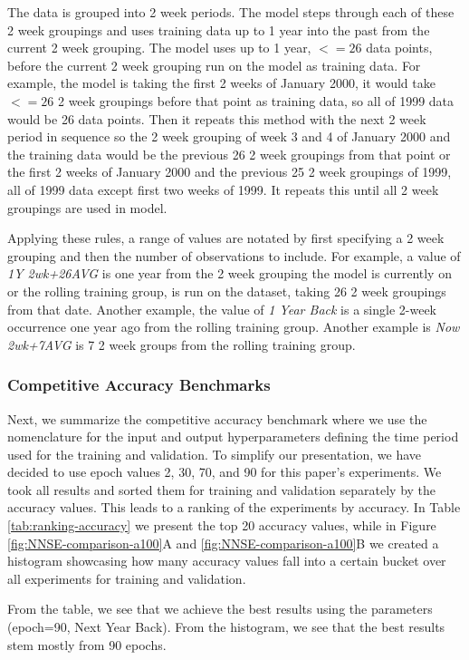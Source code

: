 \documentclass[utf8]{FrontiersinVancouver} %
\begin{document}
The data is grouped into 2 week periods. The model steps through
each of these 2 week groupings and uses training data up to 1 year
into the past from the current 2 week grouping. The model uses up 
to 1 year, $<=26$ data points, before the current 2 week grouping 
run on the model as training data. For example, the model is taking 
the first 2 weeks of January 2000, it would take $<=26$ 2 week groupings 
before that point as training data, so all of 1999 data would be 26 
data points. Then it repeats this method with the next 2 week period 
in sequence so the 2 week grouping of week 3 and 4 of January 2000 
and the training data would be the previous 26 2 week groupings from 
that point or the first 2 weeks of January 2000 and the previous 25 
2 week groupings of 1999, all of 1999 data except first two weeks of 
1999. It repeats this until all 2 week groupings are used in model.

Applying these rules, a range of values are notated by first specifying a 2 week grouping
and then the number of observations to include.  For example, a value of {\em 1Y 2wk+26AVG} 
is one year from the 2 week grouping the model is currently on or the rolling training group,
is run on the dataset, taking 26 2 week groupings from that date. Another example, the value 
of {\em 1 Year Back} is a single 2-week occurrence one year ago from the rolling training group.
Another example is {\em Now 2wk+7AVG} is 7 2 week groups from the rolling training group.


\subsubsection{Competitive Accuracy Benchmarks}

Next, we summarize the competitive accuracy benchmark where
we use the nomenclature for the input and output hyperparameters
defining the time period used for the training and validation.  To
simplify our presentation, we have decided to use epoch values 2, 30, 70, and 90 for this paper's experiments. We took all results and
sorted them for training and validation separately by the accuracy
values. This leads to a ranking of the experiments by accuracy. In
Table \ref{tab:ranking-accuracy} we present the top 20 accuracy
values, while in Figure \ref{fig:NNSE-comparison-a100}A and \ref{fig:NNSE-comparison-a100}B we created a
histogram showcasing how many accuracy values fall into a certain
bucket over all experiments for training and validation.

From the table, we see that we achieve the best
results using the parameters (epoch=90, Next Year Back). From the histogram, we see that the best results stem mostly from 90 epochs.
\end{document}
